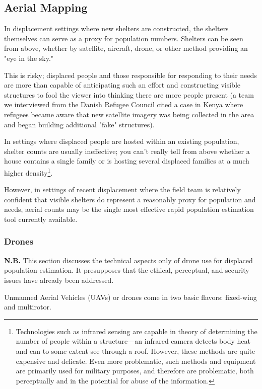 \documentclass[a4paper,12pt,twoside]{article}
\begin{document}
\subsection{Aerial Mapping}
In displacement settings where new shelters are constructed, the shelters themselves can serve as a proxy for population numbers. Shelters can be seen from above, whether by satellite, aircraft, drone, or other method providing an "eye in the sky." 

This is risky; displaced people and those responsible for responding to their needs are more than capable of anticipating such an effort and constructing visible structures to fool the viewer into thinking there are more people present (a team we interviewed from the Danish Refugee Council cited a case in Kenya where refugees became aware that new satellite imagery was being collected in the area and began building additional "fake" structures).

In settings where displaced people are hosted within an existing population, shelter counts are usually ineffective; you can't really tell from above whether a house contains a single family or is hosting several displaced families at a much higher density\footnote{Technologies such as infrared sensing are capable in theory of determining the number of people within a structure---an infrared camera detects body heat and can to some extent see through a roof. However, these methods are quite expensive and delicate. Even more problematic, such methods and equipment are primarily used for military purposes, and therefore are problematic, both perceptually and in the potential for abuse of the information.}. 

However, in settings of recent displacement where the field team is relatively confident that visible shelters do represent a reasonably proxy for population and needs, aerial counts may be the single most effective rapid population estimation tool currently available. 

\subsubsection{Drones}
\textbf{N.B.} This section discusses the technical aspects only of drone use for displaced population estimation. It presupposes that the ethical, perceptual, and security issues have already been addressed. 

Unmanned Aerial Vehicles (UAVs) or drones come in two basic flavors: fixed-wing and multirotor. 
\end{document}
